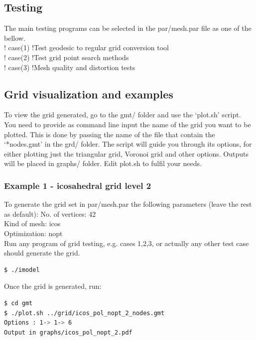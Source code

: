 \documentclass[a4paper,10pt]{article}
\begin{document}
\subsection{Testing}
The main testing programs can be selected in the par/mesh.par file as one of the bellow.\\
!  case(1) !Test geodesic to regular grid conversion tool\\
!  case(2) !Test grid point search methods\\
!  case(3) !Mesh quality and distortion tests\\


\subsection{Grid visualization and examples}

To view the grid generated, go to the gmt/ folder and use the `plot.sh' script. You need to provide as command line input the name of the grid you want to be plotted. This is done by passing the name of the file that contain the `*nodes.gmt' in the grd/ folder. The script will guide you through its options, for either plotting just the triangular grid, Voronoi grid and other options. Outputs will be placed in graphs/ folder. Edit plot.sh to fulfil your needs.

\subsubsection{Example 1 - icosahedral grid level 2}
To generate the grid set in par/mesh.par the following parameters (leave the rest as default):
No. of vertices: 42 \\
Kind of mesh: icos \\
Optimization: nopt \\
Run any program of grid testing, e.g. cases 1,2,3, or actually any other test case should generate the grid.
\begin{lstlisting}[language=bash]
$ ./imodel
\end{lstlisting}
Once the grid is generated, run:
\begin{lstlisting}[language=bash]
$ cd gmt
$ ./plot.sh ../grid/icos_pol_nopt_2_nodes.gmt 
Options : 1-> 1-> 6
Output in graphs/icos_pol_nopt_2.pdf
\end{lstlisting}
\end{document}
